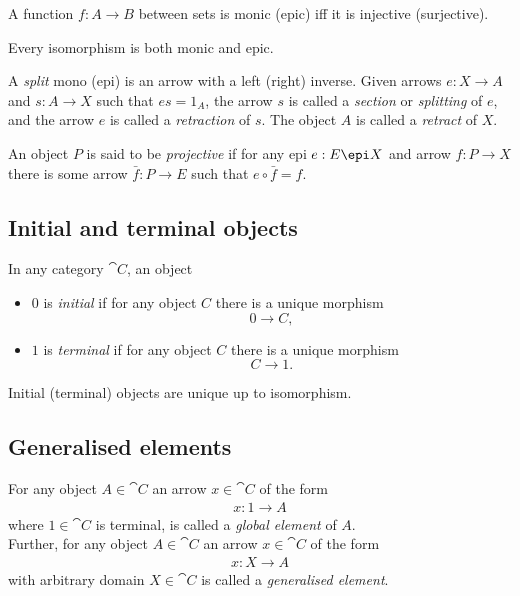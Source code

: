 \documentclass{article}
\begin{document}
\begin{proposition}[Awodey 2.2]
	A function $f:A\to B$ between sets is monic (epic) iff it is injective (surjective).
\end{proposition}

\begin{proposition}[Awodey 2.6]
	Every isomorphism is both monic and epic.
\end{proposition}

\begin{definition}[Awodey 2.7]
	A \emph{split} mono (epi) is an arrow with a left (right) inverse. Given
	arrows $e:X\to A$ and $s:A\to X$ such that $es=1_A$, the arrow $s$ is called
	a \emph{section} or \emph{splitting} of $e$, and the arrow $e$ is called a
	\emph{retraction} of $s$. The object $A$ is called a \emph{retract} of $X$.
\end{definition}

\begin{definition}
	An object $P$ is said to be \emph{projective} if for any epi $e:E\epi X$
	and arrow $f:P\to X$ there is some arrow $\bar f:P\to E$ such that
	$e\circ \bar f = f$.
\end{definition}

\subsection{Initial and terminal objects}

\begin{definition}[Awodey 2.9]
	In any category $\cat C$, an object
	\begin{itemize}
		\item $0$ is \emph{initial} if for any object $C$ there is a unique morphism
		      \[0\to C,\]
		\item $1$ is \emph{terminal} if for any object $C$ there is a unique morphism
		      \[C\to 1.\]
	\end{itemize}
\end{definition}

\begin{proposition}[Awodey 2.10]
	Initial (terminal) objects are unique up to isomorphism.
\end{proposition}

\subsection{Generalised elements}

\begin{definition}
	For any object $A\in\cat C$ an arrow $x\in\cat C$ of the form
	\begin{align*}
		x: 1 \to A
	\end{align*}
	where $1\in\cat C$ is terminal, is called a \emph{global element}
	of $A$.\\
	Further, for any object $A\in\cat C$ an arrow $x\in\cat C$ of the
	form
	\begin{align*}
		x: X\to A
	\end{align*}
	with arbitrary domain $X\in\cat C$ is called a \emph{generalised element}.
\end{definition}
\end{document}
